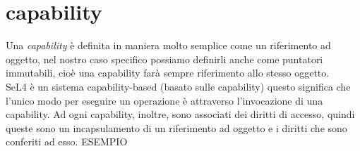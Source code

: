 \section{capability}
Una \textit{capability} è definita in maniera molto semplice come un riferimento ad oggetto, nel nostro caso specifico possiamo definirli anche come puntatori immutabili, cioè una capability farà sempre riferimento allo stesso oggetto.\\
SeL4 è un sistema capability-based (basato sulle capability) 
questo significa che l'unico modo per eseguire un operazione è attraverso l'invocazione di una capability. Ad ogni capability, inoltre, sono associati dei diritti di accesso, quindi queste sono un incapsulamento di un riferimento ad oggetto e i diritti che sono conferiti ad esso.
ESEMPIO